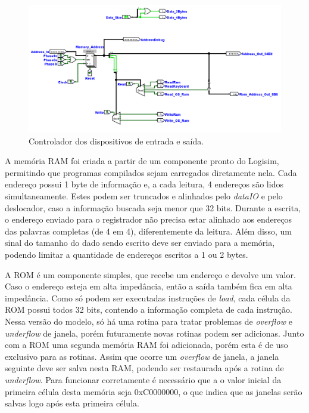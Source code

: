 \documentclass[
	article,			%
	11pt,				%
	oneside,			%
	a4paper,			%
	english,			%
	brazil,				%
	sumario=tradicional
	]{abntex2}
\begin{document}
\begin{figure}
    \centering
    \includegraphics[width=0.75\linewidth]{Logisim/IOController.png}
    \caption{Controlador dos dispositivos de entrada e saída.}
    \label{fig:IOController}
\end{figure}

A memória RAM foi criada a partir de um componente pronto do Logisim, permitindo que programas compilados sejam carregados diretamente nela. Cada endereço possui 1 byte de informação e, a cada leitura, 4 endereços são lidos simultaneamente. Estes podem ser truncados e alinhados pelo \textit{dataIO} e pelo deslocador, caso a informação buscada seja menor que 32 bits. Durante a escrita, o endereço enviado para o registrador não precisa estar alinhado aos endereços das palavras completas (de 4 em 4), diferentemente da leitura. Além disso, um sinal do tamanho do dado sendo escrito deve ser enviado para a memória, podendo limitar a quantidade de endereços escritos a 1 ou 2 bytes.

A ROM é um componente simples, que recebe um endereço e devolve um valor. Caso o endereço esteja em alta impedância, então a saída também fica em alta impedância. Como só podem ser executadas instruções de \textit{load}, cada célula da ROM possui todos 32 bits, contendo a informação completa de cada instrução. Nessa versão do modelo, só há uma rotina para tratar problemas de \textit{overflow} e \textit{underflow} de janela, porém futuramente novas rotinas podem ser adicionas. Junto com a ROM uma segunda memória RAM foi adicionada, porém esta é de uso exclusivo para as rotinas. Assim que ocorre um \textit{overflow} de janela, a janela seguinte deve ser salva nesta RAM, podendo ser restaurada após a rotina de \textit{underflow}. Para funcionar corretamente é necessário que a o valor inicial da primeira célula desta memória seja 0xC0000000, o que indica que as janelas serão salvas logo após esta primeira célula. 
\end{document}
